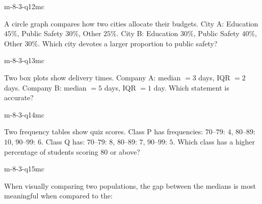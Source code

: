 \begin{practiceQuestion}{m-8-3-q12}{mc}
\begin{questionText}
A circle graph compares how two cities allocate their budgets. City A: Education $45\%$, Public Safety $30\%$, Other $25\%$. City B: Education $30\%$, Public Safety $40\%$, Other $30\%$. Which city devotes a larger proportion to public safety?
\end{questionText}
\end{practiceQuestion}

\begin{practiceQuestion}{m-8-3-q13}{mc}
\begin{questionText}
Two box plots show delivery times. Company A: median $= 3$ days, IQR $= 2$ days. Company B: median $= 5$ days, IQR $= 1$ day. Which statement is accurate?
\end{questionText}
\end{practiceQuestion}

\begin{practiceQuestion}{m-8-3-q14}{mc}
\begin{questionText}
Two frequency tables show quiz scores. Class P has frequencies: $70$--$79$: $4$, $80$--$89$: $10$, $90$--$99$: $6$. Class Q has: $70$--$79$: $8$, $80$--$89$: $7$, $90$--$99$: $5$. Which class has a higher percentage of students scoring $80$ or above?
\end{questionText}
\end{practiceQuestion}

\begin{practiceQuestion}{m-8-3-q15}{mc}
\begin{questionText}
When visually comparing two populations, the gap between the medians is most meaningful when compared to the:
\end{questionText}
\end{practiceQuestion}

